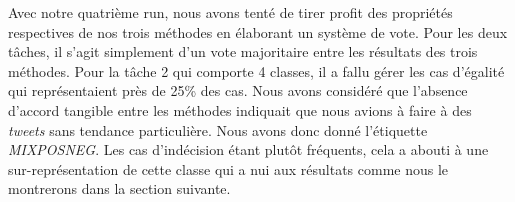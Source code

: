  Avec notre quatrième run, nous avons tenté de tirer profit des propriétés respectives de nos trois méthodes en élaborant un système de vote.
 Pour les deux tâches, il s'agit simplement d'un vote majoritaire entre les résultats des trois méthodes.
Pour la tâche 2 qui comporte 4 classes, il a fallu gérer les cas d'égalité qui représentaient près de 25\% des cas.
 Nous avons considéré que l'absence d'accord tangible entre les méthodes indiquait que nous avions à faire à des \textit{tweets} sans tendance particulière. Nous avons donc donné l'étiquette \emph{MIXPOSNEG}. Les cas d'indécision étant plutôt fréquents, cela a abouti à une sur-représentation de cette classe qui a nui aux résultats comme nous le montrerons dans la section suivante.
